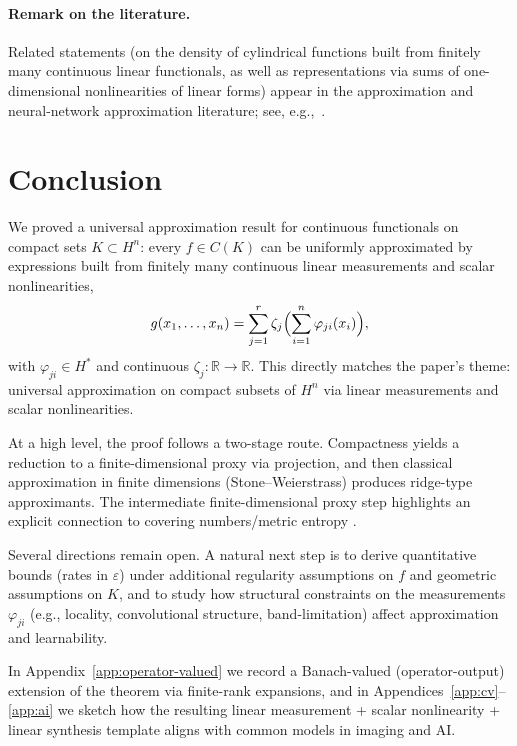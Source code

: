 \documentclass[final,12pt]{colt2026} %
\begin{document}
\paragraph{Remark on the literature.}
Related statements (on the density of cylindrical functions built from finitely many continuous linear functionals, as well as representations via sums of one-dimensional nonlinearities of linear forms) appear in the approximation and neural-network approximation literature; see, e.g.,\ \cite{pinkus_ridge,cybenko_ua,hornik_ua}.

\section{Conclusion}
We proved a universal approximation result for continuous functionals on compact sets $K\subset H^n$: every $f\in C(K)$ can be uniformly approximated by expressions built from finitely many continuous linear measurements and scalar nonlinearities,
\[
  g(x_1,\dots,x_n)=\sum_{j=1}^r \zeta_j\Bigl(\sum_{i=1}^n \varphi_{ji}(x_i)\Bigr),
\]
with $\varphi_{ji}\in H^*$ and continuous $\zeta_j\colon\mathbb{R}\to\mathbb{R}$. This directly matches the paper's theme: universal approximation on compact subsets of $H^n$ via linear measurements and scalar nonlinearities.

At a high level, the proof follows a two-stage route. Compactness yields a reduction to a finite-dimensional proxy via projection, and then classical approximation in finite dimensions (Stone--Weierstrass) produces ridge-type approximants. The intermediate finite-dimensional proxy step highlights an explicit connection to covering numbers/metric entropy \cite{kolmogorov_tikhomirov_entropy}.

Several directions remain open. A natural next step is to derive quantitative bounds (rates in $\varepsilon$) under additional regularity assumptions on $f$ and geometric assumptions on $K$, and to study how structural constraints on the measurements $\varphi_{ji}$ (e.g., locality, convolutional structure, band-limitation) affect approximation and learnability.

In Appendix~\ref{app:operator-valued} we record a Banach-valued (operator-output) extension of the theorem via finite-rank expansions, and in Appendices~\ref{app:cv}--\ref{app:ai} we sketch how the resulting linear measurement + scalar nonlinearity + linear synthesis template aligns with common models in imaging and AI.
\end{document}
